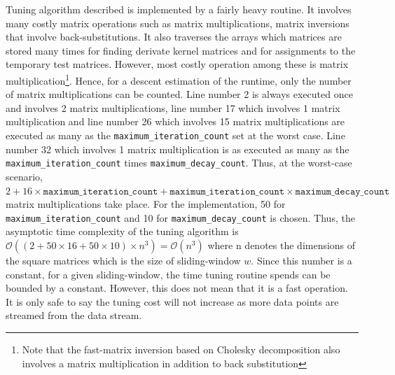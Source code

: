 Tuning algorithm described is implemented by a fairly heavy routine. It involves many costly matrix operations such as matrix multiplications, matrix inversions that involve back-substitutions. It also traverses the arrays which matrices are stored many times for finding derivate kernel matrices and for assignments to the temporary test matrices. However, most costly operation among these is matrix multiplication\footnote{Note that the fast-matrix inversion based on Cholesky decomposition also involves a matrix multiplication in addition to back substitution}. Hence, for a descent estimation of the runtime, only the number of matrix multiplications can be counted. Line number 2 is always executed once and involves 2 matrix multiplications, line number 17 which involves 1 matrix multiplication and line number 26 which involves 15 matrix multiplications are executed as many as the \texttt{maximum\_iteration\_count} set at the worst case. Line number 32 which involves 1 matrix multiplication is as executed as many as the \texttt{maximum\_iteration\_count} times \texttt{maximum\_decay\_count}. Thus, at the worst-case scenario, $2+16\times\texttt{maximum\_iteration\_count} + \texttt{maximum\_iteration\_count}\times\texttt{maximum\_decay\_count}$ matrix multiplications take place. For the implementation, 50 for \texttt{maximum\_iteration\_count} and 10 for \texttt{maximum\_decay\_count} is chosen. Thus, the asymptotic time complexity of the tuning algorithm is $\mathcal{O}((2+ 50\times16 + 50\times10)\times n^3) = \mathcal{O}(n^3)$ where n denotes the dimensions of the square matrices which is the size of sliding-window $w$. Since this number is a constant, for a given sliding-window, the time tuning routine spends can be bounded by a constant. However, this does not mean that it is a fast operation. It is only safe to say the tuning cost will not increase as more data points are streamed from the data stream.
